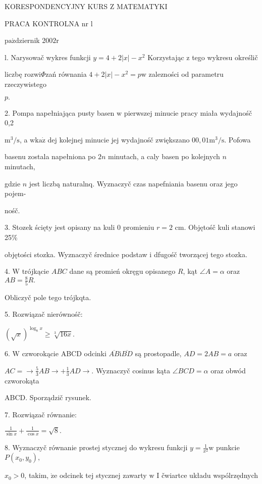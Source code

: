 \documentclass[a4paper,12pt]{article}
\begin{document}
KORESPONDENCYJNY KURS Z MATEMATYKI

PRACA KONTROLNA nr l

$\mathrm{p}\mathrm{a}\acute{\mathrm{z}}$dziernik 2$002\mathrm{r}$

l. Narysowač wykres funkcji $y=4+2|x|-x^{2}$ Korzystając $\mathrm{z}$ tego wykresu określič

liczbę rozwi$\Phi$zań równania $4+2|x|-x^{2}=p\mathrm{w}$ zalezności od parametru rzeczywistego

$p.$

2. Pompa napełniająca pusty basen $\mathrm{w}$ pierwszej minucie pracy miała wydajnośč 0,2

$\mathrm{m}^{3}/\mathrm{s}$, a $\mathrm{w}\mathrm{k}\mathrm{a}\dot{\mathrm{z}}$ dej kolejnej minucie jej wydajnośč zwiększano $00,01 \mathrm{m}^{3}/\mathrm{s}$. Pofowa

basenu zostala napełniona po $2n$ minutach, a caly basen po kolejnych $n$ minutach,

gdzie $n$ jest liczbą naturalnq. Wyznaczyč czas napefniania basenu oraz jego pojem-

nośč.

3. Stozek ścięty jest opisany na kuli $0$ promieniu $r=2$ cm. Objętośč kuli stanowi 25\%

objętości stozka. Wyznaczyč średnice podstaw $\mathrm{i}$ dfugośč tworzącej tego stozka.

4. $\mathrm{W}$ trójkącie $ABC$ dane są promień okręgu opisanego $R$, kąt $\angle A=\alpha$ oraz $AB=\displaystyle \frac{8}{5}R.$

Obliczyč pole tego trójkqta.

5. Rozwiązač nierównośč:

$(\sqrt{x})^{\log_{8}x}\geq\sqrt[3]{16x}.$

6. $\mathrm{W}$ czworokącie ABCD odcinki $\overline{AB}\mathrm{i}\overline{BD}$ są prostopadle, $AD = 2AB =a$ oraz

$ AC=\rightarrow \displaystyle \frac{5}{3}AB\rightarrow+\frac{1}{3}AD\rightarrow$. Wyznaczyč cosinus kąta $\angle BCD=\alpha$ oraz obwód czworokąta

ABCD. Sporządzič rysunek.

7. Rozwiązač równanie:

$\displaystyle \frac{1}{\sin x}+\frac{1}{\cos x}=\sqrt{8}.$

8. Wyznaczyč równanie prostej stycznej do wykresu funkcji $y=\displaystyle \frac{1}{x^{2}}\mathrm{w}$ punkcie $P(x_{0},y_{0}),$

$x_{0}>0$, takim, $\dot{\mathrm{z}}\mathrm{e}$ odcinek tej stycznej zawarty $\mathrm{w}$ I čwiartce układu wspólrzędnych
\end{document}
